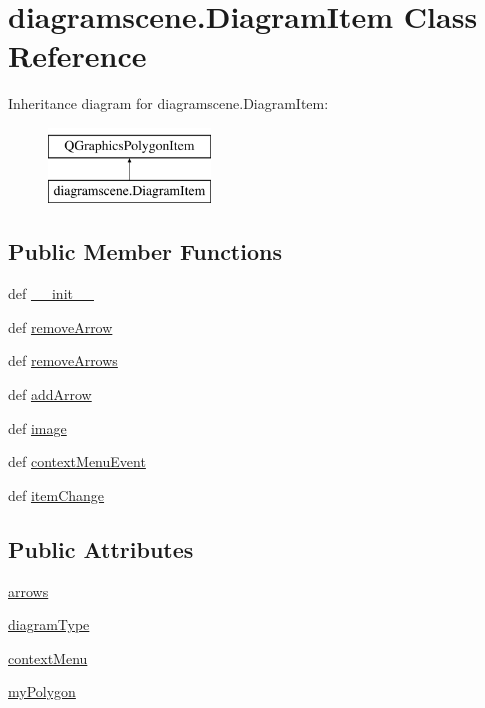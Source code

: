 \hypertarget{classdiagramscene_1_1DiagramItem}{}\section{diagramscene.\+Diagram\+Item Class Reference}
\label{classdiagramscene_1_1DiagramItem}
Inheritance diagram for diagramscene.\+Diagram\+Item\+:\begin{figure}[H]
\begin{center}
\leavevmode
\includegraphics[height=2.000000cm]{classdiagramscene_1_1DiagramItem}
\end{center}
\end{figure}
\subsection*{Public Member Functions}
\begin{DoxyCompactItemize}
\item 
def \hyperlink{classdiagramscene_1_1DiagramItem_a1114b36b53e71c6def20c94a53a38d1c}{\+\_\+\+\_\+init\+\_\+\+\_\+}
\item 
def \hyperlink{classdiagramscene_1_1DiagramItem_a85fccf8e41d7fb61e33843d017cb3727}{remove\+Arrow}
\item 
def \hyperlink{classdiagramscene_1_1DiagramItem_aaa286895d502e8520bba94e358c8ae03}{remove\+Arrows}
\item 
def \hyperlink{classdiagramscene_1_1DiagramItem_a10d6a504276ff74253fe8e90cf88d247}{add\+Arrow}
\item 
def \hyperlink{classdiagramscene_1_1DiagramItem_a6fd3b8751956d875eafad3c64e76a437}{image}
\item 
def \hyperlink{classdiagramscene_1_1DiagramItem_a7ca726f4bb78edba5a9ed9f0f0c270a4}{context\+Menu\+Event}
\item 
def \hyperlink{classdiagramscene_1_1DiagramItem_ac1ff33d9b5c04ae7b072f068f6cb7f11}{item\+Change}
\end{DoxyCompactItemize}
\subsection*{Public Attributes}
\begin{DoxyCompactItemize}
\item 
\hyperlink{classdiagramscene_1_1DiagramItem_af2d52047c1b8b975a4dfdc435b8a58a2}{arrows}
\item 
\hyperlink{classdiagramscene_1_1DiagramItem_a4e5f0d74ad318c06fec1bc95cbc2ecb8}{diagram\+Type}
\item 
\hyperlink{classdiagramscene_1_1DiagramItem_aa480463fe7981f69f5bb5cdbfeaf24e0}{context\+Menu}
\item 
\hyperlink{classdiagramscene_1_1DiagramItem_af0588b29611f965dba52757a40a023f7}{my\+Polygon}
\end{DoxyCompactItemize}


